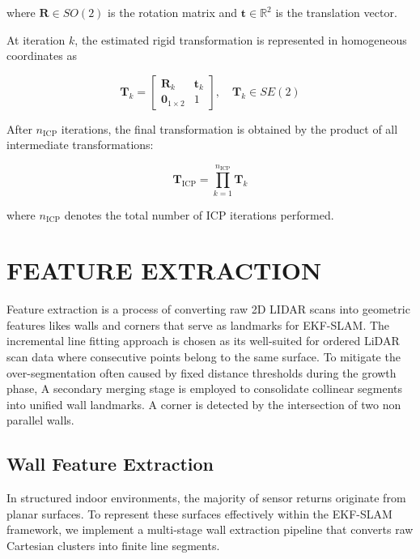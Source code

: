 \documentclass[11pt]{article}
\begin{document}
where $\mathbf{R} \in SO(2)$ is the rotation matrix and 
$\mathbf{t} \in \mathbb{R}^2$ is the translation vector.

At iteration $k$, the estimated rigid transformation is represented in 
homogeneous coordinates as

\begin{equation}
	\mathbf{T}_k =
	\begin{bmatrix}
		\mathbf{R}_k & \mathbf{t}_k \\
		\mathbf{0}_{1 \times 2} & 1
	\end{bmatrix},
	\quad \mathbf{T}_k \in SE(2)
\end{equation}

After $n_{\text{ICP}}$ iterations, the final transformation is obtained by 
the product of all intermediate transformations:

\begin{equation}
	\mathbf{T}_{\text{ICP}} =
	\prod_{k=1}^{n_{\text{ICP}}} \mathbf{T}_k
	\label{eq:icp_total_transform}
\end{equation}

where $n_{\text{ICP}}$ denotes the total number of ICP iterations performed.


\section{FEATURE EXTRACTION}

Feature extraction is a process of converting raw 2D LIDAR scans into geometric features likes walls and corners that serve as landmarks for EKF-SLAM.
The incremental line fitting approach is chosen as its well-suited for ordered LiDAR scan data where consecutive points belong to the same surface. To mitigate the over-segmentation often caused by fixed distance thresholds during the growth phase, A secondary merging stage is employed to consolidate collinear segments into unified wall landmarks. A corner is detected by the intersection of two non parallel walls.

\subsection{Wall Feature Extraction}

In structured indoor environments, the majority of sensor returns originate from planar surfaces. To represent these surfaces effectively within the EKF-SLAM framework, we implement a multi-stage wall extraction pipeline that converts raw Cartesian clusters into finite line segments.
\end{document}
